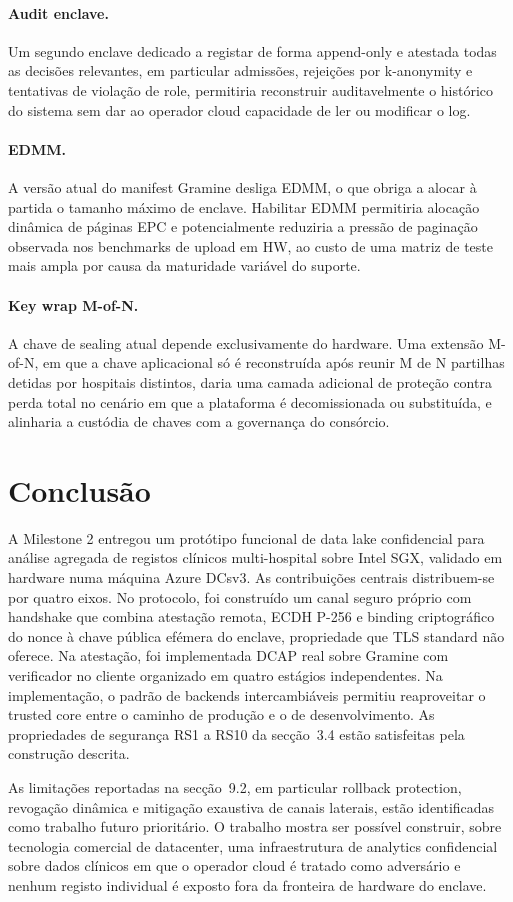 \paragraph{Audit enclave.} Um segundo enclave dedicado a registar de forma append-only e atestada todas as decisões relevantes, em particular admissões, rejeições por k-anonymity e tentativas de violação de role, permitiria reconstruir auditavelmente o histórico do sistema sem dar ao operador cloud capacidade de ler ou modificar o log.

\paragraph{EDMM.} A versão atual do manifest Gramine desliga EDMM, o que obriga a alocar à partida o tamanho máximo de enclave. Habilitar EDMM permitiria alocação dinâmica de páginas EPC e potencialmente reduziria a pressão de paginação observada nos benchmarks de upload em HW, ao custo de uma matriz de teste mais ampla por causa da maturidade variável do suporte.

\paragraph{Key wrap M-of-N.} A chave de sealing atual depende exclusivamente do hardware. Uma extensão M-of-N, em que a chave aplicacional só é reconstruída após reunir M de N partilhas detidas por hospitais distintos, daria uma camada adicional de proteção contra perda total no cenário em que a plataforma é decomissionada ou substituída, e alinharia a custódia de chaves com a governança do consórcio.

\section{Conclusão}

A Milestone 2 entregou um protótipo funcional de data lake confidencial para análise agregada de registos clínicos multi-hospital sobre Intel SGX, validado em hardware numa máquina Azure DCsv3. As contribuições centrais distribuem-se por quatro eixos. No protocolo, foi construído um canal seguro próprio com handshake que combina atestação remota, ECDH P-256 e binding criptográfico do nonce à chave pública efémera do enclave, propriedade que TLS standard não oferece. Na atestação, foi implementada DCAP real sobre Gramine com verificador no cliente organizado em quatro estágios independentes. Na implementação, o padrão de backends intercambiáveis permitiu reaproveitar o trusted core entre o caminho de produção e o de desenvolvimento. As propriedades de segurança RS1 a RS10 da secção~3.4 estão satisfeitas pela construção descrita.

As limitações reportadas na secção~9.2, em particular rollback protection, revogação dinâmica e mitigação exaustiva de canais laterais, estão identificadas como trabalho futuro prioritário. O trabalho mostra ser possível construir, sobre tecnologia comercial de datacenter, uma infraestrutura de analytics confidencial sobre dados clínicos em que o operador cloud é tratado como adversário e nenhum registo individual é exposto fora da fronteira de hardware do enclave.
